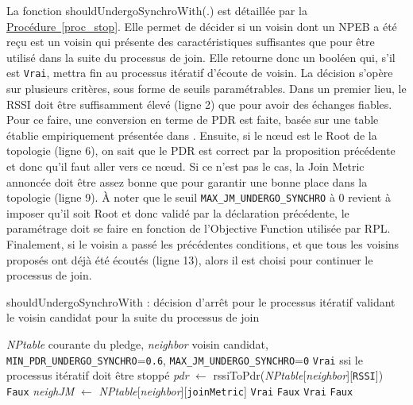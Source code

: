 \documentclass[]{report}
\newcommand{\wordlink}[2]{\hyperref[#2]{#1~\ref{#2}}}
\begin{document}
La fonction shouldUndergoSynchroWith(.) est détaillée par la \wordlink{Procédure}{proc_stop}.
Elle permet de décider si un voisin dont un NPEB a été reçu est un voisin qui présente des caractéristiques suffisantes que pour être utilisé dans la suite du processus de join. Elle retourne donc un booléen qui, s'il est \texttt{Vrai}, mettra fin au processus itératif d'écoute de voisin. La décision s'opère sur plusieurs critères, sous forme de seuils paramétrables. Dans un premier lieu, le RSSI doit être suffisamment élevé (ligne 2) que pour avoir des échanges fiables. Pour ce faire, une conversion en terme de PDR est faite, basée sur une table établie empiriquement présentée dans \cite{simulating-6TiSCH}. Ensuite, si le nœud est le Root de la topologie (ligne 6), on sait que le PDR est correct par la proposition précédente et donc qu'il faut aller vers ce nœud. Si ce n'est pas le cas, la Join Metric annoncée doit être assez bonne que pour garantir une bonne place dans la topologie (ligne 9). À noter que le seuil \texttt{MAX\_JM\_UNDERGO\_SYNCHRO} à 0 revient à imposer qu'il soit Root et donc validé par la déclaration précédente, le paramétrage doit se faire en fonction de l'Objective Function utilisée par RPL. Finalement, si le voisin a passé les précédentes conditions, et que tous les voisins proposés ont déjà été écoutés (ligne 13), alors il est choisi pour continuer le processus de join. 

\newpage

\begin{algorithm}[!h]
\caption{shouldUndergoSynchroWith : décision d'arrêt pour le processus itératif validant le voisin candidat pour la suite du processus de join}
\begin{algorithmic}[1]
\Require \textit{NPtable} courante du pledge, \textit{neighbor} voisin candidat, \texttt{MIN\_PDR\_UNDERGO\_SYNCHRO}=\texttt{0.6}, \texttt{MAX\_JM\_UNDERGO\_SYNCHRO}=\texttt{0}
\Ensure \texttt{Vrai} ssi le processus itératif doit être stoppé
\State \textit{pdr} $\leftarrow$ rssiToPdr(\textit{NPtable}[\textit{neighbor}][\texttt{RSSI}])
\State\Return \texttt{Faux}
\EndIf
\State \textit{neighJM} $\leftarrow$ \textit{NPtable}[\textit{neighbor}][\texttt{joinMetric}]
\State\Return \texttt{Vrai}
\EndIf
{}
\State\Return \texttt{Faux}
\EndIf
{}
\State\Return \texttt{Vrai}
\EndIf
\EndIf
\State\Return \texttt{Faux}
\end{algorithmic}
\label{proc_stop}
\end{algorithm}
\vspace{0.4cm}
\end{document}
